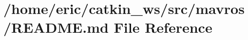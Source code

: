 \hypertarget{mavros_2README_8md}{}\section{/home/eric/catkin\+\_\+ws/src/mavros/\+R\+E\+A\+D\+ME.md File Reference}
\label{mavros_2README_8md}
